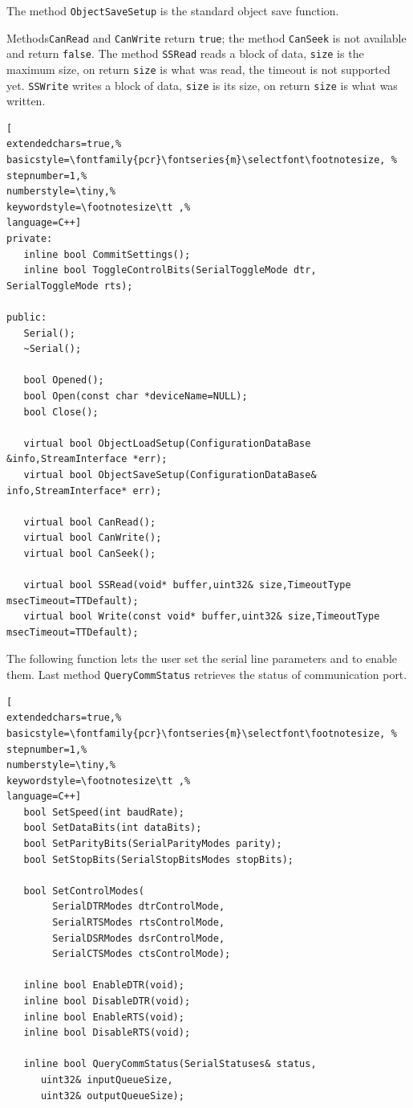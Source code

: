 The method \texttt{ObjectSaveSetup} is the standard object save function.

Methods\texttt{CanRead} and \texttt{CanWrite} return \texttt{true}; the method \texttt{CanSeek} is not available and return \texttt{false}.
The method \texttt{SSRead} reads a block of data, \texttt{size} is the maximum size, on return \texttt{size} is what was read, the timeout is not supported yet. \texttt{SSWrite} writes a block of data,  \texttt{size} is its size, on return \texttt{size} is what was written.
\begin{lstlisting}[
extendedchars=true,%
basicstyle=\fontfamily{pcr}\fontseries{m}\selectfont\footnotesize, %
stepnumber=1,%
numberstyle=\tiny,%
keywordstyle=\footnotesize\tt ,%
language=C++]
private:
   inline bool CommitSettings();
   inline bool ToggleControlBits(SerialToggleMode dtr, SerialToggleMode rts);

public:
   Serial();
   ~Serial();

   bool Opened();
   bool Open(const char *deviceName=NULL);
   bool Close();

   virtual bool ObjectLoadSetup(ConfigurationDataBase &info,StreamInterface *err);
   virtual bool ObjectSaveSetup(ConfigurationDataBase& info,StreamInterface* err);

   virtual bool CanRead();
   virtual bool CanWrite();
   virtual bool CanSeek();

   virtual bool SSRead(void* buffer,uint32& size,TimeoutType msecTimeout=TTDefault);
   virtual bool Write(const void* buffer,uint32& size,TimeoutType msecTimeout=TTDefault);
\end{lstlisting}

The following function lets the user set the serial line parameters and to enable them.
Last method \texttt{QueryCommStatus} retrieves the status of communication port.
\begin{lstlisting}[
extendedchars=true,%
basicstyle=\fontfamily{pcr}\fontseries{m}\selectfont\footnotesize, %
stepnumber=1,%
numberstyle=\tiny,%
keywordstyle=\footnotesize\tt ,%
language=C++]
   bool SetSpeed(int baudRate);
   bool SetDataBits(int dataBits);
   bool SetParityBits(SerialParityModes parity);
   bool SetStopBits(SerialStopBitsModes stopBits);

   bool SetControlModes(
        SerialDTRModes dtrControlMode,
        SerialRTSModes rtsControlMode,
        SerialDSRModes dsrControlMode,
        SerialCTSModes ctsControlMode);

   inline bool EnableDTR(void);
   inline bool DisableDTR(void);
   inline bool EnableRTS(void);
   inline bool DisableRTS(void);

   inline bool QueryCommStatus(SerialStatuses& status,
      uint32& inputQueueSize,
      uint32& outputQueueSize);
\end{lstlisting}



